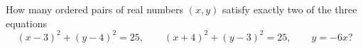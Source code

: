How many ordered pairs of real numbers $(x,y)$ satisfy exactly two of the three equations
\[(x-3)^2+(y-4)^2=25,\qquad (x+4)^2+(y-3)^2=25,\qquad y=-6x?\]
